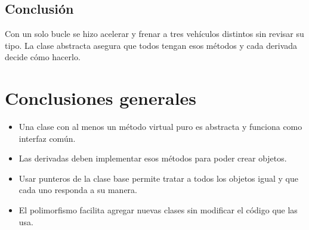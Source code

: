 \documentclass[12pt]{article}
\begin{document}
\subsection*{Conclusión}
Con un solo bucle se hizo acelerar y frenar a tres vehículos distintos sin revisar su tipo. La clase abstracta asegura que todos tengan esos métodos y cada derivada decide cómo hacerlo.

\section*{Conclusiones generales}
\begin{itemize}[leftmargin=0.5cm]
    \item Una clase con al menos un método virtual puro es abstracta y funciona como interfaz común.
    \item Las derivadas deben implementar esos métodos para poder crear objetos.
    \item Usar punteros de la clase base permite tratar a todos los objetos igual y que cada uno responda a su manera.
    \item El polimorfismo facilita agregar nuevas clases sin modificar el código que las usa.
\end{itemize}
\end{document}
